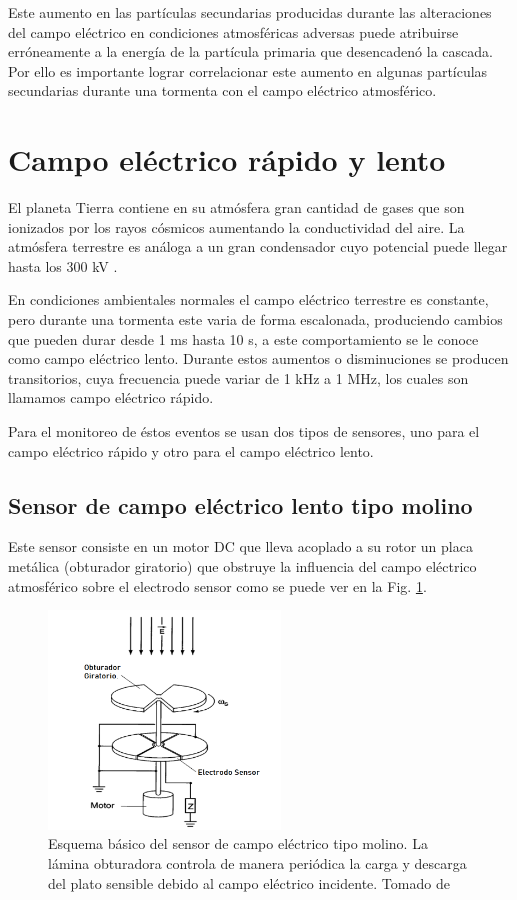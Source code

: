 \documentclass[12pt,a4paper,oneside]{book}
\begin{document}
Este aumento en las partículas secundarias producidas durante las alteraciones del campo eléctrico en condiciones atmosféricas adversas puede atribuirse erróneamente a la energía de la partícula primaria que desencadenó la cascada. Por ello es importante lograr correlacionar este aumento en algunas partículas secundarias durante una tormenta con el campo eléctrico atmosférico.

\section{Campo eléctrico rápido y lento}

El planeta Tierra contiene en su atmósfera gran cantidad de gases que son ionizados por los rayos cósmicos aumentando la conductividad del aire. La atmósfera terrestre es análoga a un gran condensador cuyo potencial puede llegar hasta los 300 kV \cite{ogawa1973analyses}.

En condiciones ambientales normales el campo eléctrico terrestre es constante, pero durante una tormenta este varia de forma escalonada, produciendo cambios que pueden durar desde 1 ms hasta 10 s, a este comportamiento se le conoce como campo eléctrico lento. Durante estos aumentos o disminuciones se producen transitorios, cuya frecuencia puede variar de 1 kHz a 1 MHz, los cuales son llamamos campo eléctrico rápido. \medskip

Para el monitoreo de éstos eventos se usan dos tipos de sensores, uno para el campo eléctrico rápido y otro para el campo eléctrico lento. \medskip

\subsection{Sensor de campo eléctrico lento tipo molino}

Este sensor consiste en un motor DC que lleva acoplado a su rotor un placa metálica (obturador giratorio) que obstruye la influencia del campo eléctrico atmosférico sobre el electrodo sensor como se puede ver en la Fig. \ref{figm}.

\begin{figure}[ht]
  \centering
  \includegraphics[width=0.55\textwidth]{Field_Mill.png}
  \caption{ Esquema básico del sensor de campo eléctrico tipo molino. La lámina obturadora controla de manera periódica la carga y descarga del plato sensible debido al campo eléctrico incidente. Tomado de \cite{ibrahim2011measurement} }
  \label{figm}
\end{figure}
\end{document}
